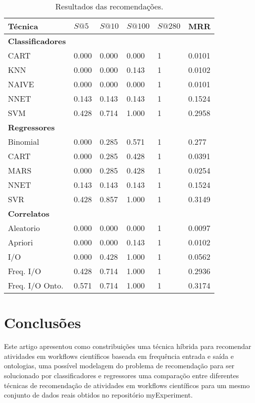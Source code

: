 \documentclass{sig-alternate-05-2015}
\begin{document}
\begin{table}
\centering
\caption{Resultados das recomendações.}
\label{TAB_RESULTADOS}

\begin{tabular}{|l|l|l|l|l|l|} \hline
\textbf{Técnica} & \textbf{\(S@5\)} & \textbf{\(S@10\)} & \textbf{\(S@100\)} & \textbf{\(S@280\)} & \textbf{MRR} \\ \hline
\textbf{Classificadores} &&&&& \\ \hline
CART 								&	0.000	&	0.000	&	0.000	&	1	&	0.0101	\\ \hline
KNN 								&	0.000	&	0.000	&	0.143	&	1	&	0.0102	\\ \hline
NAIVE 								&	0.000	&	0.000	&	0.000	&	1	&	0.0101	\\ \hline
NNET 								&	0.143	&	0.143	&	0.143	&	1	&	0.1524	\\ \hline
SVM 								&	0.428	&	0.714	&	1.000	&	1	&	0.2958	\\ \hline
\textbf{Regressores} &&&&& \\ \hline
Binomial 							&	0.000	&	0.285	&	0.571	&	1	&	0.277	\\ \hline
CART 								&	0.000	&	0.285	&	0.428	&	1	&	0.0391	\\ \hline
MARS 								&	0.000	&	0.285	&	0.428	&	1	&	0.0254	\\ \hline
NNET 								&	0.143	&	0.143	&	0.143	&	1	&	0.1524	\\ \hline
SVR 								&	0.428	&	0.857	&	1.000	&	1	&	0.3149	\\ \hline
\textbf{Correlatos} &&&&& \\ \hline
Aleatorio							&	0.000	&	0.000	&	0.000	&	1	&	0.0097	\\ \hline
Apriori								&	0.000	&	0.000	&	0.143	&	1	&	0.0102	\\ \hline
I/O									&	0.000	&	0.428	&	1.000	&	1	&	0.0562	\\ \hline
Freq. I/O							&	0.428	&	0.714	&	1.000	&	1	&	0.2936	\\ \hline
Freq. I/O Onto.						&	0.571	&	0.714	&	1.000	&	1	&	0.3174	\\ 
\hline\end{tabular}
\end{table}


\section{Conclusões}\label{CONCLUSOES}
Este artigo apresentou como constribuições uma técnica híbrida para recomendar atividades em workflows científicos baseada em frequência entrada e saída e ontologias, uma possível modelagem do problema de recomendação para ser solucionado por classificadores e regressores uma comparaçõo entre diferentes técnicas de recomendação de atividades em workflows científicos para um mesmo conjunto de dados reais obtidos no repositório myExperiment. 
\end{document}
